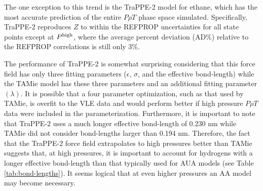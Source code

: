 \documentclass[preprint,letterpaper,floatfix,citeautoscript,aip,jcp]{revtex4-1}
\begin{document}
The one exception to this trend is the TraPPE-2 model for ethane, which has the most accurate prediction of the entire $P \rho T$ phase space simulated. Specifically, TraPPE-2 reproduces $Z$ to within the REFPROP uncertainties for all state points except at $P^{\rm high}$, where the average percent deviation (AD\%) relative to the REFPROP correlations is still only 3\%.


The performance of TraPPE-2 is somewhat surprising considering that this force field has only three fitting parameters ($\epsilon$, $\sigma$, and the effective bond-length) while the TAMie model has these three parameters and an additional fitting parameter $(\lambda)$. It is possible that a four parameter optimization, such as that used by TAMie, is overfit to the VLE data and would perform better if high pressure $P \rho T$ data were included in the parameterization. Furthermore, it is important to note that TraPPE-2 uses a much longer effective bond-length of 0.230 nm while TAMie did not consider bond-lengths larger than 0.194 nm. Therefore, the fact that the TraPPE-2 force field extrapolates to high pressures better than TAMie suggests that, at high pressures, it is important to account for hydrogens with a longer effective bond-length than that typically used for AUA models (see Table \ref{tab:bond-lengths}). It seems logical that at even higher pressures an AA model may become necessary.

\end{document}
